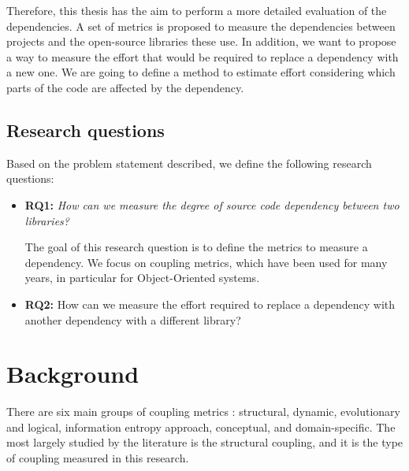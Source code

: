 \documentclass[a4paper]{article}
\begin{document}
Therefore, this thesis has the aim to perform a more detailed evaluation of the dependencies. A set of metrics is proposed to measure the dependencies between projects and the open-source libraries these use. In addition, we want to propose a way to measure the effort that would be required to replace a dependency with a new one. We are going to define a method to estimate effort considering which parts of the code are affected by the dependency.

\subsection{Research questions}
Based on the problem statement described, we define the following research questions:

\begin{itemize}[noitemsep]
  \item \textbf{RQ1:} \textit{How can we measure the degree of source code dependency between two libraries?}

  The goal of this research question is to define the metrics to measure a dependency. We focus on coupling metrics, which have been used for many years, in particular for Object-Oriented systems.

  \item \textbf{RQ2:} How can we measure the effort required to replace a dependency with another dependency with a different library?
\end{itemize}

\section{Background}\label{section:Background}
There are six main groups of coupling metrics \cite{poshyvanyk2006conceptual}: structural, dynamic, evolutionary and logical, information entropy approach, conceptual, and domain-specific. The most largely studied by the literature is the structural coupling, and it is the type of coupling measured in this research.
\end{document}
